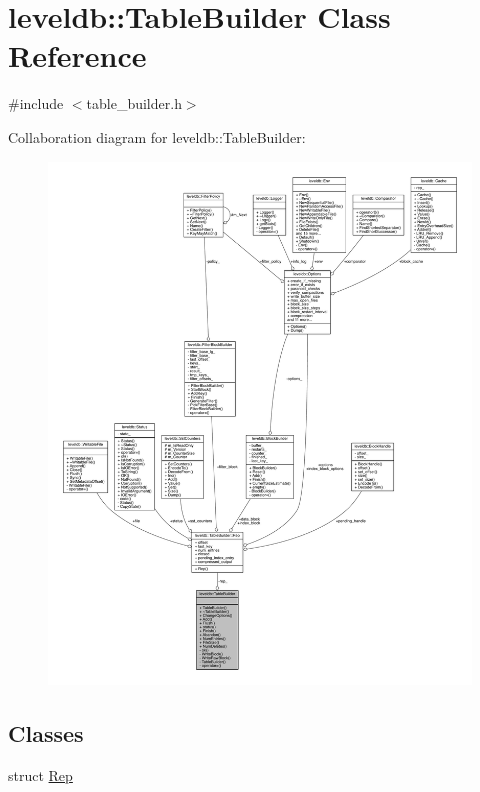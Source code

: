 \hypertarget{classleveldb_1_1_table_builder}{}\section{leveldb\+:\+:Table\+Builder Class Reference}
\label{classleveldb_1_1_table_builder}


{\ttfamily \#include $<$table\+\_\+builder.\+h$>$}



Collaboration diagram for leveldb\+:\+:Table\+Builder\+:
\nopagebreak
\begin{figure}[H]
\begin{center}
\leavevmode
\includegraphics[width=350pt]{classleveldb_1_1_table_builder__coll__graph}
\end{center}
\end{figure}
\subsection*{Classes}
\begin{DoxyCompactItemize}
\item 
struct \hyperlink{structleveldb_1_1_table_builder_1_1_rep}{Rep}
\end{DoxyCompactItemize}
